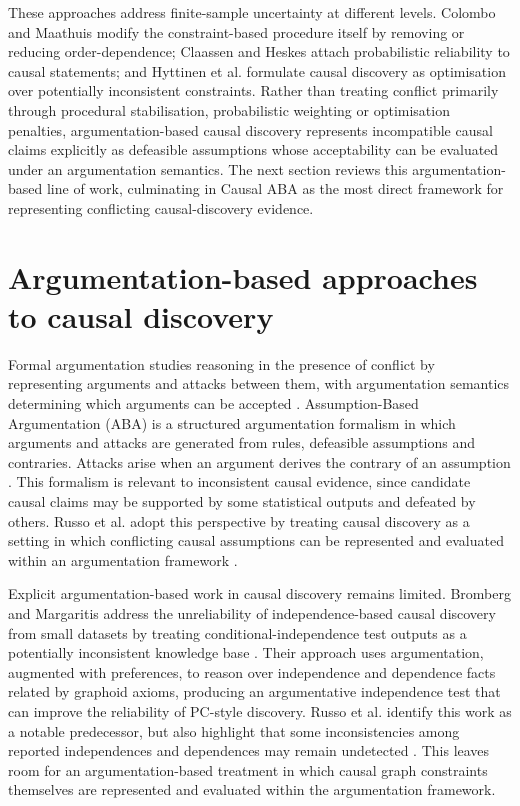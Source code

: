 These approaches address finite-sample uncertainty at different levels. Colombo and Maathuis modify the constraint-based procedure itself by removing or reducing order-dependence; Claassen and Heskes attach probabilistic reliability to causal statements; and Hyttinen et al. formulate causal discovery as optimisation over potentially inconsistent constraints. Rather than treating conflict primarily through procedural stabilisation, probabilistic weighting or optimisation penalties, argumentation-based causal discovery represents incompatible causal claims explicitly as defeasible assumptions whose acceptability can be evaluated under an argumentation semantics. The next section reviews this argumentation-based line of work, culminating in Causal ABA as the most direct framework for representing conflicting causal-discovery evidence.

\section{Argumentation-based approaches to causal discovery}
Formal argumentation studies reasoning in the presence of conflict by representing arguments and attacks between them, with argumentation semantics determining which arguments can be accepted \cite{dung1995acceptability}. Assumption-Based Argumentation (ABA) \cite{bondarenko1997abstract} is a structured argumentation formalism in which arguments and attacks are generated from rules, defeasible assumptions and contraries. Attacks arise when an argument derives the contrary of an assumption \cite{toni2014tutorial}. This formalism is relevant to inconsistent causal evidence, since candidate causal claims may be supported by some statistical outputs and defeated by others. Russo et al. adopt this perspective by treating causal discovery as a setting in which conflicting causal assumptions can be represented and evaluated within an argumentation framework \cite{russo2024argumentative}.

Explicit argumentation-based work in causal discovery remains limited. Bromberg and Margaritis address the unreliability of independence-based causal discovery from small datasets by treating conditional-independence test outputs as a potentially inconsistent knowledge base \cite{bromberg2009improving}. Their approach uses argumentation, augmented with preferences, to reason over independence and dependence facts related by graphoid axioms, producing an argumentative independence test that can improve the reliability of PC-style discovery. Russo et al. identify this work as a notable predecessor, but also highlight that some inconsistencies among reported independences and dependences may remain undetected \cite{russo2024argumentative}. This leaves room for an argumentation-based treatment in which causal graph constraints themselves are represented and evaluated within the argumentation framework.

